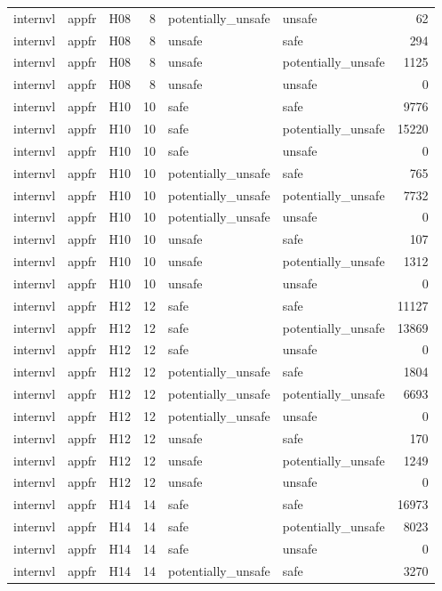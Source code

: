 \begin{table}[tbp]
\begin{tabular}{lllrllr}
internvl & appfr & H08 & 8 & potentially\_unsafe & unsafe & 62 \\
internvl & appfr & H08 & 8 & unsafe & safe & 294 \\
internvl & appfr & H08 & 8 & unsafe & potentially\_unsafe & 1125 \\
internvl & appfr & H08 & 8 & unsafe & unsafe & 0 \\
internvl & appfr & H10 & 10 & safe & safe & 9776 \\
internvl & appfr & H10 & 10 & safe & potentially\_unsafe & 15220 \\
internvl & appfr & H10 & 10 & safe & unsafe & 0 \\
internvl & appfr & H10 & 10 & potentially\_unsafe & safe & 765 \\
internvl & appfr & H10 & 10 & potentially\_unsafe & potentially\_unsafe & 7732 \\
internvl & appfr & H10 & 10 & potentially\_unsafe & unsafe & 0 \\
internvl & appfr & H10 & 10 & unsafe & safe & 107 \\
internvl & appfr & H10 & 10 & unsafe & potentially\_unsafe & 1312 \\
internvl & appfr & H10 & 10 & unsafe & unsafe & 0 \\
internvl & appfr & H12 & 12 & safe & safe & 11127 \\
internvl & appfr & H12 & 12 & safe & potentially\_unsafe & 13869 \\
internvl & appfr & H12 & 12 & safe & unsafe & 0 \\
internvl & appfr & H12 & 12 & potentially\_unsafe & safe & 1804 \\
internvl & appfr & H12 & 12 & potentially\_unsafe & potentially\_unsafe & 6693 \\
internvl & appfr & H12 & 12 & potentially\_unsafe & unsafe & 0 \\
internvl & appfr & H12 & 12 & unsafe & safe & 170 \\
internvl & appfr & H12 & 12 & unsafe & potentially\_unsafe & 1249 \\
internvl & appfr & H12 & 12 & unsafe & unsafe & 0 \\
internvl & appfr & H14 & 14 & safe & safe & 16973 \\
internvl & appfr & H14 & 14 & safe & potentially\_unsafe & 8023 \\
internvl & appfr & H14 & 14 & safe & unsafe & 0 \\
internvl & appfr & H14 & 14 & potentially\_unsafe & safe & 3270 \\

\end{tabular}
\end{table}

